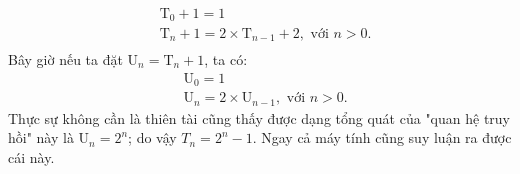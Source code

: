 \begin{equation*}
    \begin{aligned}
        & \mathrm{T}_0 + 1 = 1 \\
        & \mathrm{T}_n + 1 = 2 \times \mathrm{T}_{n - 1} + 2, \text{ \ \ \ \ với } n > 0. \\ 
    \end{aligned}
\end{equation*}
Bây giờ nếu ta đặt $\mathrm{U}_n = \mathrm{T}_n + 1$, ta có:
\begin{equation}\label{1.3}
    \begin{aligned}
        & \mathrm{U}_0 = 1 \\
        & \mathrm{U}_n = 2 \times \mathrm{U}_{n - 1}, \text{ \ \ \ \ với } n > 0.
    \end{aligned}
\end{equation}
Thực sự không cần là thiên tài cũng thấy được dạng tổng quát của "quan hệ truy hồi" này là $\mathrm{U}_n = 2^n$; do vậy $T_n = 2^n - 1$. Ngay cả máy tính cũng suy luận ra được cái này.
